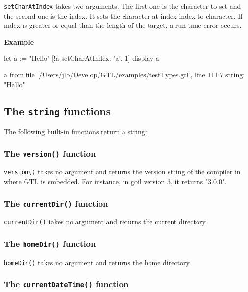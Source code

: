 \documentclass[10pt,openright,twosides,final]{memoir}
\newcommand{\scst}[1]{{\footnotesize\ttfamily\colorbox{light-blue}{"#1"}}}
\newcommand{\gtlarg}[1]{{\footnotesize\ttfamily\colorbox{light-blue}{#1}}}
\newcommand{\gtlinline}[1]{\colorbox{light-blue}{\lstinline[language=gtl]{#1}}}
\newcommand{\example}{\vspace{.75em}\noindent\textbf{Example}\vspace{0em}}
\begin{document}
\gtlinline{setCharAtIndex} takes two arguments. The first one is the \gtlarg{character} to set and the second one is the \gtlarg{index}. It sets the character at index \gtlarg{index} to \gtlarg{character}. If \gtlarg{index} is greater or equal than the length of the target, a run time error occurs.

\example
\begin{gtl}
let a := "Hello"
[!a setCharAtIndex: 'a', 1]
display a
\end{gtl}
\begin{console}
a from file '/Users/jlb/Develop/GTL/examples/testTypes.gtl', line 111:7
    string: "Hallo"
\end{console}

\subsection{The \texttt{string} functions}

The following built-in functions return a string:

\subsubsection{The \texttt{version()} function}

\gtlinline{version()} takes no argument and returns the version string of the compiler in where GTL is embedded. For instance, in goil version 3, it returns \scst{3.0.0}.

\subsubsection{The \texttt{currentDir()} function}

\gtlinline{currentDir()} takes no argument and returns the current directory.

\subsubsection{The \texttt{homeDir()} function}

\gtlinline{homeDir()} takes no argument and returns the home directory.

\subsubsection{The \texttt{currentDateTime()} function}
\end{document}
